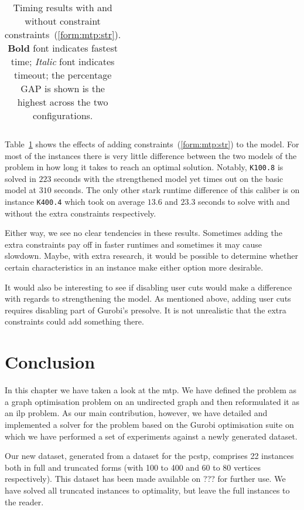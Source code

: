 \begin{table}[h!]
  \centering
  \begin{tabular}[h!]{|c|c|c|c|c|}\hline
    
  \end{tabular}
  \caption{Timing results with and without constraint constraints~(\ref{form:mtp:str}).
    \textbf{Bold} font indicates fastest time;
    \textit{Italic} font indicates
    timeout; the percentage GAP is shown is the highest across the two configurations.} 
  \label{tab:jmp:strengthen}
\end{table}

Table~\ref{tab:jmp:strengthen} shows the effects of adding constraints~(\ref{form:mtp:str}) to
the model. For most of the instances there is very little difference between the two models
of the problem in how long it takes to reach an optimal solution. Notably, \texttt{K100.8} is
solved in $223$ seconds with the strengthened model yet times out on the basic model at $310$
seconds. The only other stark runtime difference of this caliber is on instance \texttt{K400.4}
which took on average $13.6$ and $23.3$ seconds to solve with and without the extra constraints
respectively.

Either way, we see no clear tendencies in these results. Sometimes adding the extra constraints
pay off in faster runtimes and sometimes it may cause slowdown. Maybe, with extra research, it
would be possible to determine whether certain characteristics in an instance make either option
more desirable.

It would also be interesting to see if disabling user cuts would make a difference with regards
to strengthening the model. As mentioned above, adding user cuts requires disabling part of
Gurobi's presolve. It is not unrealistic that the extra constraints could add something there.
\section{Conclusion}
In this chapter we have taken a look at the \acrlong{mtp}. We have defined the problem as
a graph optimisation problem on an undirected graph and then reformulated it as an \gls{ilp}
problem. As our main contribution, however, we have detailed and implemented a solver for the
problem based on the Gurobi optimisation suite on which we have performed a set of experiments
against a newly generated dataset.

Our new dataset, generated from a dataset for the \gls{pcstp}, comprises 22 instances both in
full and truncated forms (with 100 to 400 and 60 to 80 vertices respectively). This dataset
has been made available on ??? for further use. We have solved all truncated instances to
optimality, but leave the full instances to the reader.

